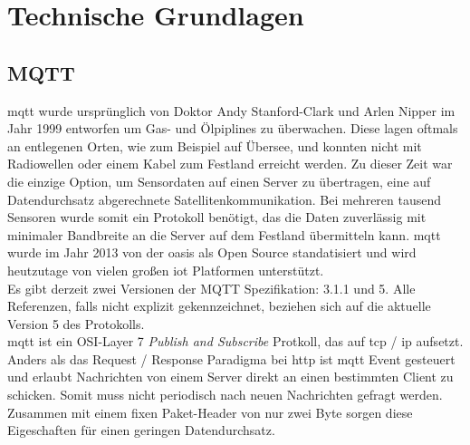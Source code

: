 \section{Technische Grundlagen} \label{s:basics}

\subsection{MQTT} \label{s:mqtt}
\acf{mqtt} wurde ursprünglich von Doktor Andy Stanford-Clark und Arlen Nipper im Jahr 1999 entworfen um Gas- und Ölpiplines zu überwachen. Diese lagen oftmals an entlegenen Orten, wie zum Beispiel auf Übersee, und konnten nicht mit Radiowellen oder einem Kabel zum Festland erreicht werden. Zu dieser Zeit war die einzige Option, um Sensordaten auf einen Server zu übertragen, eine auf Datendurchsatz abgerechnete Satellitenkommunikation. Bei mehreren tausend Sensoren wurde somit ein Protokoll benötigt, das die Daten zuverlässig mit minimaler Bandbreite an die Server auf dem Festland übermitteln kann.
\ac{mqtt} wurde im Jahr 2013 von der \ac{oasis} als Open Source standatisiert und wird heutzutage von vielen gro{\ss}en \ac{iot} Platformen unterstützt.
\cite{WhatMQTTDefinition}\\
Es gibt derzeit zwei Versionen der MQTT Spezifikation: 3.1.1 und 5. Alle Referenzen, falls nicht explizit gekennzeichnet, beziehen sich auf die aktuelle Version 5 des Protokolls.\\
\ac{mqtt} ist ein OSI-Layer 7 \textit{Publish and Subscribe} Protkoll, das auf \acs{tcp} / \acs{ip} aufsetzt. Anders als das Request / Response Paradigma bei \acs{http} ist \ac{mqtt} Event gesteuert und erlaubt Nachrichten von einem Server direkt an einen bestimmten Client zu schicken. Somit muss nicht periodisch nach neuen Nachrichten gefragt werden. Zusammen mit einem fixen Paket-Header von nur zwei Byte sorgen diese Eigeschaften für einen geringen Datendurchsatz.\cite{WhatMQTTDefinition}

